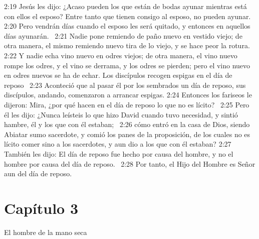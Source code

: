 2:19 Jesús les dijo: ¿Acaso pueden los que están de bodas ayunar mientras está con ellos el esposo? Entre tanto que tienen consigo al esposo, no pueden ayunar.  
2:20 Pero vendrán días cuando el esposo les será quitado, y entonces en aquellos días ayunarán.  
2:21 Nadie pone remiendo de paño nuevo en vestido viejo; de otra manera, el mismo remiendo nuevo tira de lo viejo, y se hace peor la rotura.  
2:22 Y nadie echa vino nuevo en odres viejos; de otra manera, el vino nuevo rompe los odres, y el vino se derrama, y los odres se pierden; pero el vino nuevo en odres nuevos se ha de echar. 
Los discípulos recogen espigas en el día de reposo   
2:23 Aconteció que al pasar él por los sembrados un día de reposo, sus discípulos, andando, comenzaron a arrancar espigas. 
2:24 Entonces los fariseos le dijeron: Mira, ¿por qué hacen en el día de reposo lo que no es lícito?  
2:25 Pero él les dijo: ¿Nunca leísteis lo que hizo David cuando tuvo necesidad, y sintió hambre, él y los que con él estaban;  
2:26 cómo entró en la casa de Dios, siendo Abiatar sumo sacerdote, y comió los panes de la proposición, de los cuales no es lícito comer sino a los sacerdotes, y aun dio a los que con él estaban? 
2:27 También les dijo: El día de reposo fue hecho por causa del hombre, y no el hombre por causa del día de reposo.  
2:28 Por tanto, el Hijo del Hombre es Señor aun del día de reposo. 
\section*{Capítulo 3}
El hombre de la mano seca   

